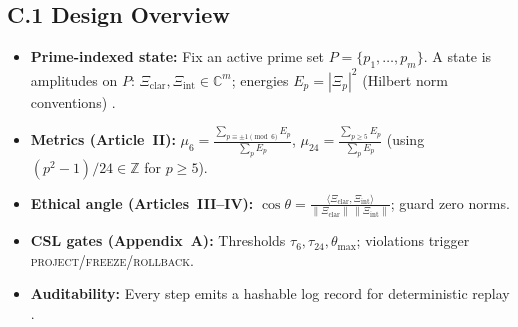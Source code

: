 \documentclass[12pt]{amsart}
\theoremstyle{plain}
\begin{document}
\subsection*{C.1 Design Overview}
\begin{itemize}
  \item \textbf{Prime-indexed state:} Fix an active prime set $P=\{p_1,\dots,p_m\}$. A state is amplitudes on $P$: $\Xi_{\mathrm{clar}},\Xi_{\mathrm{int}}\in\mathbb{C}^{m}$; energies $E_p=|\Xi_p|^2$ (Hilbert norm conventions) \cite{rudin1991functional,conway1990functional}.
  \item \textbf{Metrics (Article~II):} 
  $\mu_6=\frac{\sum_{p\equiv\pm1\!\!\!\pmod{6}} E_p}{\sum_{p}E_p}$,\quad
  $\mu_{24}=\frac{\sum_{p\ge5} E_p}{\sum_{p}E_p}$ (using $(p^2-1)/24\in\mathbb{Z}$ for $p\ge5$). 
  \item \textbf{Ethical angle (Articles~III–IV):} 
  $\cos\theta=\frac{\langle \Xi_{\mathrm{clar}},\Xi_{\mathrm{int}}\rangle}{\|\Xi_{\mathrm{clar}}\|\,\|\Xi_{\mathrm{int}}\|}$; guard zero norms.
  \item \textbf{CSL gates (Appendix~A):} Thresholds $\tau_6,\tau_{24},\theta_{\max}$; violations trigger \textsc{project}/\textsc{freeze}/\textsc{rollback}.
  \item \textbf{Auditability:} Every step emits a hashable log record for deterministic replay \cite{schneider2000enforceable}.
\end{itemize}
\end{document}
